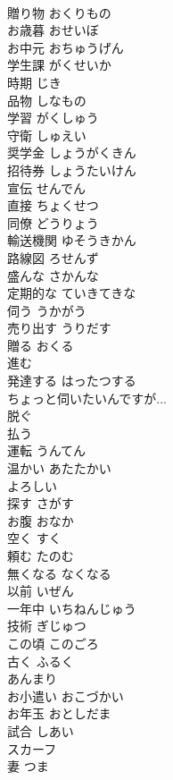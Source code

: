 \documentclass[8pt]{extreport}
\begin{document}
\begin{CJK}{UTF8}{min}
\\	贈り物	おくりもの	
\\	お歳暮	おせいぼ	
\\	お中元	おちゅうげん	
\\	学生課	がくせいか	
\\	時期	じき	
\\	品物	しなもの	
\\	学習	がくしゅう	
\\	守衛	しゅえい	
\\	奨学金	しょうがくきん	
\\	招待券	しょうたいけん	
\\	宣伝	せんでん	
\\	直接	ちょくせつ	
\\	同僚	どうりょう	
\\	輸送機関	ゆそうきかん	
\\	路線図	ろせんず	
\\	盛んな	さかんな	
\\	定期的な	ていきてきな	
\\	伺う	うかがう	
\\	売り出す	うりだす	
\\	贈る	おくる	
\\	進む		
\\	発達する	はったつする	
\\	ちょっと伺いたいんですが...		
\\	脱ぐ		
\\	払う		
\\	運転	うんてん	
\\	温かい	あたたかい	
\\	よろしい		
\\	探す	さがす	
\\	お腹	おなか	
\\	空く	すく	
\\	頼む	たのむ	
\\	無くなる	なくなる	
\\	以前	いぜん	
\\	一年中	いちねんじゅう	
\\	技術	ぎじゅつ	
\\	この頃	このごろ	
\\	古く	ふるく	
\\	あんまり		
\\	お小遣い	おこづかい	
\\	お年玉	おとしだま	
\\	試合	しあい	
\\	スカーフ		
\\	妻	つま	

\end{CJK}
\end{document}
